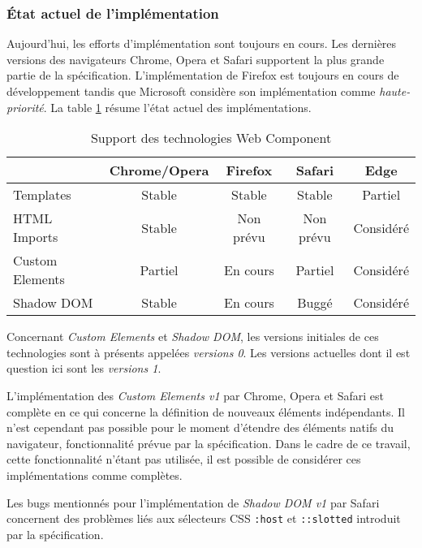 \subsubsection{État actuel de l'implémentation}

Aujourd'hui, les efforts d'implémentation sont toujours en cours. Les dernières versions des navigateurs Chrome, Opera et Safari supportent la plus grande partie de la spécification. L'implémentation de Firefox est toujours en cours de développement tandis que Microsoft considère son implémentation comme \emph{haute-priorité}. La table \ref{tab:webcomp-support} résume l'état actuel des implémentations.

\begin{table}[h]
	\centering
	\caption{Support des technologies Web Component}
	\label{tab:webcomp-support}
	\begin{tabular}{@{}lcccc@{}}
		\toprule
		& Chrome/Opera & Firefox   & Safari  & Edge      \\ \midrule
		Templates       & Stable         & Stable    & Stable    & Partiel   \\
		HTML Imports    & Stable         & Non prévu & Non prévu & Considéré \\
		Custom Elements & Partiel        & En cours  & Partiel   & Considéré \\
		Shadow DOM      & Stable         & En cours  & Buggé   & Considéré \\ \bottomrule
	\end{tabular}
\end{table}

Concernant \emph{Custom Elements} et \emph{Shadow DOM}, les versions initiales de ces technologies sont à présents appelées \emph{versions 0}. Les versions actuelles dont il est question ici sont les \emph{versions 1}.

L'implémentation des \emph{Custom Elements v1} par Chrome, Opera et Safari est complète en ce qui concerne la définition de nouveaux éléments indépendants. Il n'est cependant pas possible pour le moment d'étendre des éléments natifs du navigateur, fonctionnalité prévue par la spécification. Dans le cadre de ce travail, cette fonctionnalité n'étant pas utilisée, il est possible de considérer ces implémentations comme complètes.

Les bugs mentionnés pour l'implémentation de \emph{Shadow DOM v1} par Safari concernent des problèmes liés aux sélecteurs CSS \texttt{:host} et \texttt{::slotted} introduit par la spécification.

